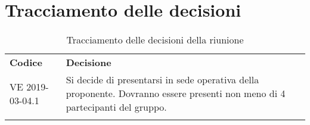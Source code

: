 \clearpage
\section{Tracciamento delle decisioni}
\label{sec:tracciamento}
\begin{center}
	\renewcommand{\arraystretch}{1.5}
	\begin{longtable}{  p{2.8cm} p{11.4cm} }
		\rowcolor{tableHeadYellow}
		\textbf{Codice}&\textbf{Decisione}\\
		VE 2019-03-04.1 & Si decide di presentarsi in sede operativa della proponente. Dovranno essere presenti non meno di 4 partecipanti del gruppo.\\
		\rowcolor{white}
		\caption{Tracciamento delle decisioni della riunione}
	\end{longtable}	
\end{center}